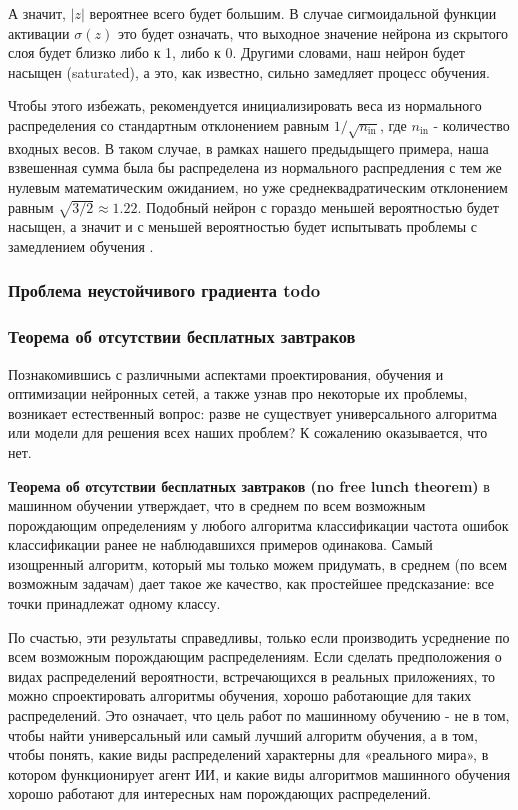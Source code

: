 А значит, $|z|$ вероятнее всего будет большим. В случае сигмоидальной функции активации 
$\sigma(z)$ это будет означать, что выходное значение нейрона из скрытого слоя будет 
близко либо к 1, либо к 0. Другими словами, наш нейрон будет насыщен (saturated), а это, 
как известно, сильно замедляет процесс обучения. 

Чтобы этого избежать, рекомендуется инициализировать веса из нормального распределения со 
стандартным отклонением равным $1/\sqrt{n_\text{in}}$, где $n_\text{in}$ - количество входных 
весов. В таком случае, в рамках нашего предыдыщего примера, наша взвешенная сумма была бы 
распределена из нормального распредления с тем же нулевым математическим ожиданием, но 
уже среднеквадратическим отклонением равным $\sqrt{3/2} \approx 1.22$. Подобный нейрон с 
гораздо меньшей вероятностью будет насыщен, а значит и с меньшей вероятностью будет 
испытывать проблемы с замедлением обучения \cite{NN_Nielsen}.

\subsubsection{Проблема неустойчивого градиента {\color{red} todo}}



\subsubsection{Теорема об отсутствии бесплатных завтраков}

Познакомившись с различными аспектами проектирования, 
обучения и оптимизации нейронных сетей, а также узнав про некоторые их проблемы, 
возникает естественный вопрос: разве не существует универсального алгоритма или 
модели для решения всех наших проблем? К сожалению оказывается, что нет.

\textbf{Теорема об отсутствии бесплатных завтраков (no free lunch theorem)} 
в машинном обучении \cite{NFL} утверждает, что в среднем по 
всем возможным порождающим определениям у любого алгоритма классификации 
частота ошибок классификации ранее не наблюдавшихся примеров одинакова.
Самый изощренный алгоритм, который мы только можем придумать, в среднем (по
всем возможным задачам) дает такое же качество, как простейшее предсказание: все
точки принадлежат одному классу.

По счастью, эти результаты справедливы, только если производить усреднение по
всем возможным порождающим распределениям. Если сделать предположения о видах 
распределений вероятности, встречающихся в реальных приложениях, то можно
спроектировать алгоритмы обучения, хорошо работающие для таких распределений.
Это означает, что цель работ по машинному обучению - не в том, чтобы найти
универсальный или самый лучший алгоритм обучения, а в том, чтобы понять, какие
виды распределений характерны для «реального мира», в котором функционирует
агент ИИ, и какие виды алгоритмов машинного обучения хорошо работают для интересных 
нам порождающих распределений.

